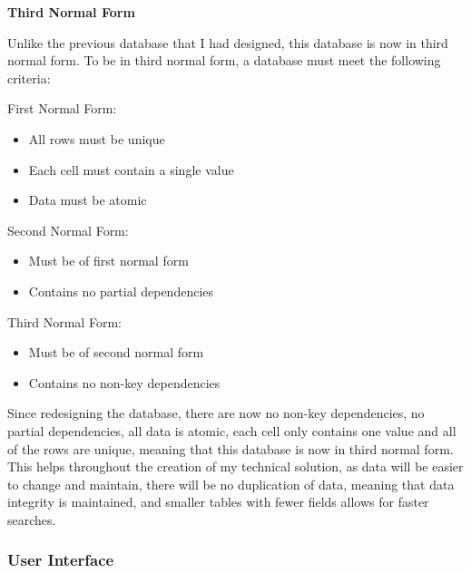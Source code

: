 \documentclass{article}
\begin{document}
\textbf{Third Normal Form}

Unlike the previous database that I had designed, this database is now in third normal form. To be in third normal form, a database must meet the following criteria:

First Normal Form:
\begin{itemize}
    \item All rows must be unique
    \item Each cell must contain a single value
    \item Data must be atomic
\end{itemize}
\clearpage
Second Normal Form:
\begin{itemize}
    \item Must be of first normal form
    \item Contains no partial dependencies
\end{itemize}

Third Normal Form:
\begin{itemize}
    \item Must be of second normal form
    \item Contains no non-key dependencies
\end{itemize}

Since redesigning the database, there are now no non-key dependencies, no partial dependencies, all data is atomic, each cell only contains one value and all of the rows are unique, meaning that this database is now in third normal form. This helps throughout the creation of my technical solution, as data will be easier to change and maintain, there will be no duplication of data, meaning that data integrity is maintained, and smaller tables with fewer fields allows for faster searches.

\subsubsection{User Interface}
\end{document}
